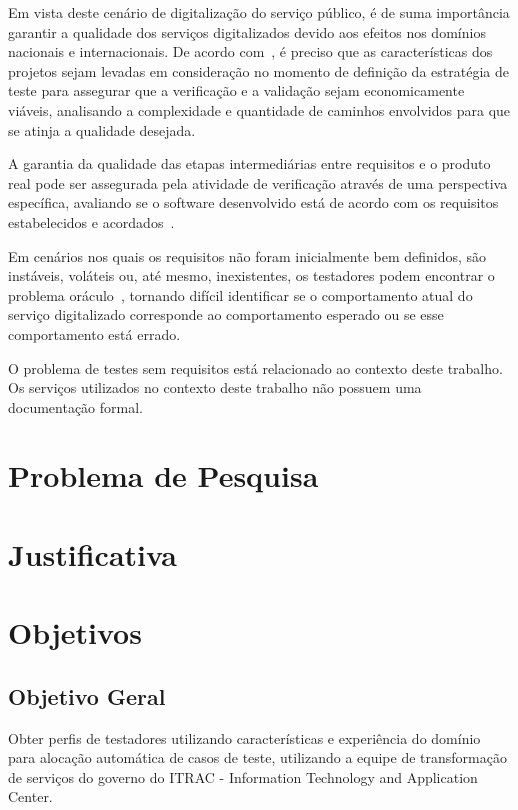 Em vista deste cenário de digitalização do serviço público, é de suma importância garantir a qualidade dos serviços digitalizados
devido aos efeitos nos domínios nacionais e internacionais. De acordo com~\cite{myers2004art}, é preciso que as características
dos projetos sejam levadas em consideração no momento de definição da estratégia de teste para assegurar que a verificação e
a validação sejam economicamente viáveis, analisando a complexidade e quantidade de caminhos envolvidos para que se atinja a
qualidade desejada.

A garantia da qualidade das etapas intermediárias entre requisitos e o produto real pode ser assegurada pela atividade de
verificação através de uma perspectiva específica, avaliando se o software desenvolvido está de acordo com os requisitos
estabelecidos e acordados~\cite{wallace1989software}.

Em cenários nos quais os requisitos não foram inicialmente bem definidos, são instáveis, voláteis ou, até mesmo, inexistentes,
os testadores podem encontrar o problema oráculo~\cite{barr2015oracle}, tornando difícil identificar se o comportamento atual do
serviço digitalizado corresponde ao comportamento esperado ou se esse comportamento está errado.

O problema de testes sem requisitos está relacionado ao contexto deste trabalho. Os serviços utilizados no contexto deste trabalho
não possuem uma documentação formal.

\section{Problema de Pesquisa}

\section{Justificativa}

\section{Objetivos}
\subsection{Objetivo Geral}

Obter perfis de testadores utilizando características e experiência do domínio para alocação automática de casos de teste,
utilizando a equipe de transformação de serviços do governo do ITRAC - Information Technology and Application Center.

